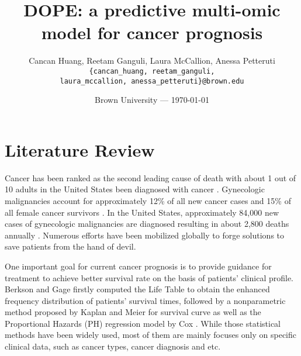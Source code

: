 \documentclass{article}
\title{DOPE: a predictive multi-omic model for cancer prognosis} %
\author{Cancan Huang, Reetam Ganguli, Laura McCallion, Anessa Petteruti\\ \texttt{\{cancan\_huang, reetam\_ganguli,} \\ \texttt{laura\_mccallion, anessa\_petteruti\}@brown.edu}} %
\date{Brown University --- \today} %
\begin{document}
\maketitle %

\vspace{-1cm}
\section*{Literature Review} %

Cancer has been ranked as the second leading cause of death with about 1 out of 10 adults in the United States been diagnosed with cancer \cite[]{aruleba2020applications,siegel2019cancer}. Gynecologic malignancies account for approximately 12\% of all new cancer cases and 15\% of all female cancer survivors \cite[]{salani2017update}. In the United States, approximately 84,000 new cases of gynecologic malignancies are diagnosed resulting in about 2,800 deaths annually \cite[]{stewart2013gynecologic}. Numerous efforts have been mobilized globally to forge solutions to save patients from the hand of devil.



One important goal for current cancer prognosis is to provide guidance for treatment to achieve better survival rate on the basis of patients' clinical profile. 
Berkson and Gage \cite[][]{rp1950calculation} firstly computed the Life Table to obtain the enhanced frequency distribution of patients' survival times, followed by a nonparametric method proposed by Kaplan and Meier \cite[][]{kaplan1958nonparametric} for survival curve as well as the Proportional Hazards (PH) regression model by Cox \cite[][]{cox1972regression}. While those statistical methods have been widely used, most of them are mainly focuses only on specific clinical data, such as cancer types, cancer diagnosis and etc.
\end{document}
